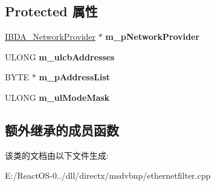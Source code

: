 \subsection*{Protected 属性}
\begin{DoxyCompactItemize}
\item 
\mbox{\label{class_c_ethernet_filter_ac0c5b9d45467973be08f06ea29b02141}} 
\hyperlink{interface_i_b_d_a___network_provider}{I\+B\+D\+A\+\_\+\+Network\+Provider} $\ast$ {\bfseries m\+\_\+p\+Network\+Provider}
\item 
\mbox{\label{class_c_ethernet_filter_a6cdc840ecc0f278e7663b3de12e17ab4}} 
U\+L\+O\+NG {\bfseries m\+\_\+ulcb\+Addresses}
\item 
\mbox{\label{class_c_ethernet_filter_ae8ff7d4d641f38651cff2de8846ee0a3}} 
B\+Y\+TE $\ast$ {\bfseries m\+\_\+p\+Address\+List}
\item 
\mbox{\label{class_c_ethernet_filter_a1f7126b84ae91e0b7f1c82b64bfda536}} 
U\+L\+O\+NG {\bfseries m\+\_\+ul\+Mode\+Mask}
\end{DoxyCompactItemize}
\subsection*{额外继承的成员函数}


该类的文档由以下文件生成\+:\begin{DoxyCompactItemize}
\item 
E\+:/\+React\+O\+S-\/0../dll/directx/msdvbnp/ethernetfilter.\+cpp\end{DoxyCompactItemize}
